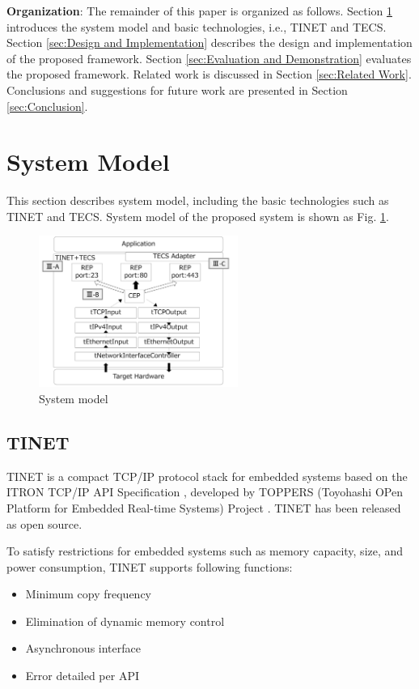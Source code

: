 \documentclass[conference]{IEEEtran/IEEEtran}
\begin{document}
{\bf Organization}: The remainder of this paper is organized as follows.
Section \ref{sec:System Model} introduces the system model and basic technologies, i.e., TINET and TECS.
Section \ref{sec:Design and Implementation} describes the design and implementation of the proposed framework.
Section \ref{sec:Evaluation and Demonstration} evaluates the proposed framework.
Related work is discussed in Section \ref{sec:Related Work}.
Conclusions and suggestions for future work are presented in Section \ref{sec:Conclusion}.


\section{System Model}
\label{sec:System Model}

This section describes system model, including the basic technologies such as TINET and TECS.
System model of the proposed system is shown as Fig. \ref{fig:System Model}.

\begin{figure}[t]
    \centering
    \includegraphics[width=6.5cm,clip]{figure/SystemModel.pdf}
    \caption{System model}
    \label{fig:System Model}
\end{figure}

\subsection{TINET}

TINET is a compact TCP/IP protocol stack for embedded systems based on the ITRON TCP/IP API Specification \cite{url:ITRON_TCP/IP_API_Spec}, developed by TOPPERS (Toyohashi OPen Platform for Embedded Real-time Systems) Project \cite{url:TOPPERS}.
TINET has been released as open source.

To satisfy restrictions for embedded systems such as memory capacity, size, and power consumption, TINET supports following functions:

\begin{itemize}
    \item Minimum copy frequency
    \item Elimination of dynamic memory control
    \item Asynchronous interface
    \item Error detailed per API
\end{itemize}
\end{document}
